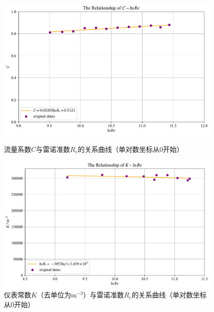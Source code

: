 \documentclass[UTF8,AutoFakeBold,a4paper]{article}
\begin{document}
\newpage
\begin{figure}[h]
	\centering
	\includegraphics[scale=0.5]{文丘里3}
	\caption{流量系数$C$与雷诺准数$R_{e}$的关系曲线（单对数坐标从0开始）}
	\label{fi3}
	
	\centering
	\includegraphics[scale=0.5]{涡轮3}
	\caption{仪表常数$K$（去单位为m$^{-3}$）与雷诺准数$R_{e}$的关系曲线（单对数坐标从0开始）}
	\label{fi4}
\end{figure}



\newpage
\end{document}
